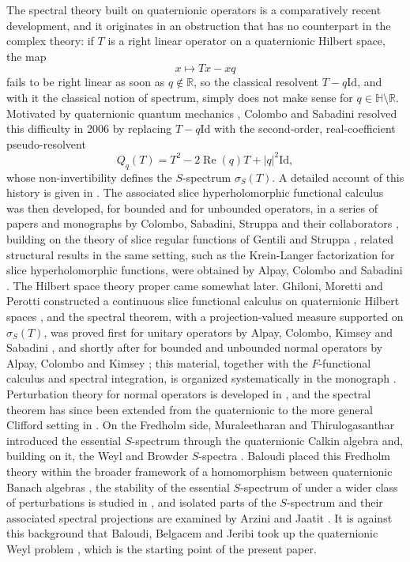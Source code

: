 \documentclass[12pt,a4paper]{article}
\theoremstyle{plain}
\theoremstyle{definition}
\theoremstyle{remark}
\newcommand{\HH}{\mathbb H}
\newcommand{\RR}{\mathbb R}
\newcommand{\Id}{\mathrm{Id}}
\newcommand{\sigS}{\sigma_S}
\DeclareMathOperator{\Rea}{Re}
\begin{document}
{The spectral theory built on quaternionic operators is a comparatively
recent development, and it originates in an obstruction that has no
counterpart in the complex theory: if $T$ is a right linear operator
on a quaternionic Hilbert space, the map $$x\mapsto Tx-xq$$ fails to be
right linear as soon as $q\notin\RR$, so the classical resolvent
$T-q\Id$, and with it the classical notion of spectrum, simply does
not make sense for $q\in\HH\setminus\RR$. Motivated by quaternionic
quantum mechanics \cite{Adler1995}, Colombo and Sabadini resolved this
difficulty in 2006 by replacing $T-q\Id$ with the second-order,
real-coefficient pseudo-resolvent $$Q_q(T)=T^2-2\Rea(q)T+|q|^2\Id,$$
whose non-invertibility defines the $S$-spectrum $\sigS(T)$. A detailed
account of this history is given in
\cite[Section 1.2.1]{ColomboGantnerKimsey2018}. The associated slice
hyperholomorphic functional calculus was then developed, for bounded
and for unbounded operators, in a series of papers and monographs by
Colombo, Sabadini, Struppa and their collaborators
\cite{Colombo,ColomboSabadini2009,ColomboSabadini2010,
ColomboGentiliSabadiniStruppa2010,ColomboSabadiniStruppa2011,FJGanter,
GN0},
building on the theory of slice regular functions of Gentili and
Struppa \cite{GS}, related structural results in the same setting,
such as the Krein-Langer factorization for slice hyperholomorphic
functions, were obtained by Alpay, Colombo and Sabadini \cite{KRE}.
The Hilbert space theory proper came somewhat
later. Ghiloni, Moretti and Perotti constructed a continuous slice
functional calculus on quaternionic Hilbert spaces
\cite{GhiloniMorettiPerotti2013}, and the spectral theorem, with a
projection-valued measure supported on $\sigS(T)$, was proved first
for unitary operators by Alpay, Colombo, Kimsey and Sabadini
\cite{AlpayColomboKimsey2016Unitary}, and shortly after for bounded
and unbounded normal operators by Alpay, Colombo and Kimsey
\cite{AlpayColomboKimsey2016}; this material, together with the
$F$-functional calculus and spectral integration, is organized
systematically in the monograph \cite{ColomboGantnerKimsey2018}. Perturbation theory for normal
operators is developed in \cite{PF}, and the spectral theorem has
since been extended from the quaternionic to the more general Clifford
setting in \cite{FD1}. On the Fredholm side, Muraleetharan and
Thirulogasanthar introduced the essential $S$-spectrum through the
quaternionic Calkin algebra \cite{MuraleetharanThirulogasanthar2018}
and, building on it, the Weyl and Browder $S$-spectra
\cite{MuraleetharanThirulogasanthar2019}. Baloudi placed this Fredholm
theory within the broader framework of a homomorphism between
quaternionic Banach algebras \cite{BaloudiFredholm2022}, the
stability of the essential $S$-spectrum of
\cite{MuraleetharanThirulogasanthar2018} under a wider class of
perturbations is studied in \cite{Baloudi2020}, and isolated parts of
the $S$-spectrum and their associated spectral projections are
examined by Arzini and Jaatit \cite{ArziniJaatit2025}. It is against
this background that Baloudi, Belgacem and Jeribi took up the
quaternionic Weyl problem \cite{BaloudiBelgacemJeribi2022}, which is
the starting point of the present paper.

}
\end{document}
